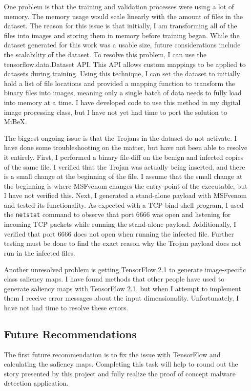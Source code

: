 \documentclass[12pt, letterpaper, titlepage]{article}
\newcommand{\msfv}{MSFvenom}
\newcommand{\payloadName}{TCP bind shell}
\begin{document}
One problem is that the training and validation processes were using a lot of memory.
The memory usage would scale linearly with the amount of files in the dataset.
The reason for this issue is that initially, I am transforming all of the files into images and storing them in memory before training began.
While the dataset generated for this work was a usable size, future considerations include the scalability of the dataset.
To resolve this problem, I can use the tensorflow.data.Dataset API.
This API allows custom mappings to be applied to datasets during training.
Using this technique, I can set the dataset to initially hold a list of file locations and provided a mapping function to transform the binary files into images, meaning only a single batch of data needs to fully load into memory at a time.
I have developed code to use this method in my digital image processing class, but I have not yet had time to port the solution to MiBeX.

The biggest ongoing issue is that the Trojans in the dataset do not activate.
I have done some troubleshooting on the matter, but have not been able to resolve it entirely.
First, I performed a binary file-diff on the benign and infected copies of the same file.
I verified that the Trojan was actually being inserted, and there is a small change at the beginning of the file.
I assume that the small change at the beginning is where \msfv{} changes the entry-point of the executable, but I have not verified this.
Next, I generated a stand-alone payload with \msfv{} and tested its functionality.
As expected with a \payloadName{} program, I used the \verb|netstat| command to observe that port 6666 was open and listening for incoming TCP packets while running the stand-alone payload.
Additionally, I verified that port 6666 does not open when running the infected file.
Further testing must be done to find the exact reason why the Trojan payload does not run in the infected files.

Another unresolved problem is getting TensorFlow 2.1 to generate image-specific class saliency maps.
I have found methods that other people have used to generate saliency maps with TensorFlow 2.1, but when I attempt to implement them I receive error messages about the input dimensionality.
Unfortunately, I have not had time to resolve these errors.

\subsection{Future Recommendations}
The first future recommendation is to fix the issue with TensorFlow and calculating the saliency maps.
Completing this task will help to round out the story presented by this project and fully realize the proof of concept malware detection application.
\end{document}
